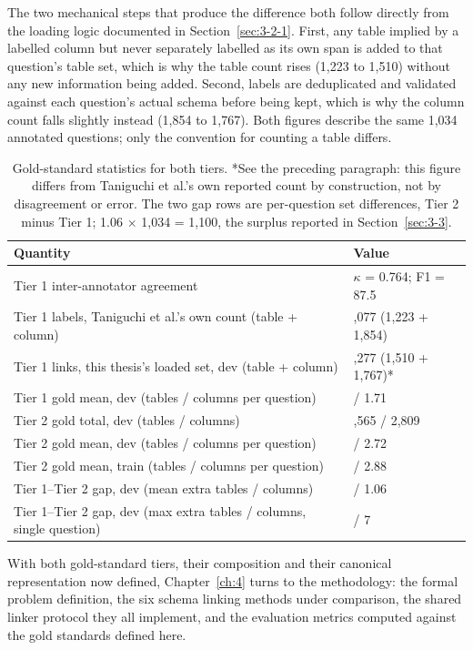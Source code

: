 The two mechanical steps that produce the difference both follow directly from the loading logic documented in Section~\ref{sec:3-2-1}. First, any table implied by a labelled column but never separately labelled as its own span is added to that question's table set, which is why the table count rises (1,223 to 1,510) without any new information being added. Second, labels are deduplicated and validated against each question's actual schema before being kept, which is why the column count falls slightly instead (1,854 to 1,767). Both figures describe the same 1,034 annotated questions; only the convention for counting a table differs.

\begin{table}[htbp]
\centering
\caption{Gold-standard statistics for both tiers. *See the preceding paragraph: this figure differs from Taniguchi et al.'s own reported count by construction, not by disagreement or error. The two gap rows are per-question set differences, Tier 2 minus Tier 1; 1.06 \ensuremath{\times} 1,034 = 1,100, the surplus reported in Section~\ref{sec:3-3}.}\label{tab:3-4}
\setlength{\tabcolsep}{6pt}
\begin{tabular}{@{}>{\raggedright\arraybackslash}p{}>{\raggedright\arraybackslash}p{}@{}}
\toprule
\textbf{Quantity} & \textbf{Value}\tabularnewline
\midrule
Tier 1 inter-annotator agreement & \ensuremath{\kappa} = 0.764; F1 = 87.5\tabularnewline
Tier 1 labels, Taniguchi et al.'s own count (table + column) & 3,077 (1,223 + 1,854)\tabularnewline
Tier 1 links, this thesis's loaded set, dev (table + column) & 3,277 (1,510 + 1,767)*\tabularnewline
Tier 1 gold mean, dev (tables / columns per question) & 1.46 / 1.71\tabularnewline
Tier 2 gold total, dev (tables / columns) & 1,565 / 2,809\tabularnewline
Tier 2 gold mean, dev (tables / columns per question) & 1.51 / 2.72\tabularnewline
Tier 2 gold mean, train (tables / columns per question) & 1.55 / 2.88\tabularnewline
Tier 1--Tier 2 gap, dev (mean extra tables / columns) & 0.09 / 1.06\tabularnewline
Tier 1--Tier 2 gap, dev (max extra tables / columns, single question) & 3 / 7\tabularnewline
\bottomrule
\end{tabular}
\end{table}




With both gold-standard tiers, their composition and their canonical representation now defined, Chapter~\ref{ch:4} turns to the methodology: the formal problem definition, the six schema linking methods under comparison, the shared linker protocol they all implement, and the evaluation metrics computed against the gold standards defined here.
